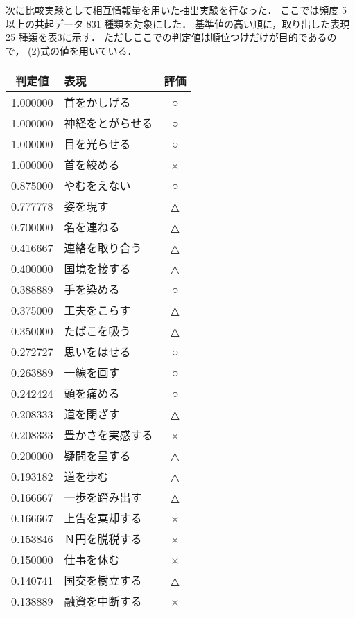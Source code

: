 次に比較実験として相互情報量を用いた抽出実験を行なった．
ここでは頻度 5 以上の共起データ 831 種類を対象にした．
基準値の高い順に，取り出した表現 25 種類を表3に示す．
ただしここでの判定値は順位つけだけが目的であるので，
(2)式の値を用いている．



\noindent
\begin{minipage}{70mm} 
\vspace{5mm}
\small
  \begin{center}
    \begin{tabular}{|c|l|c|} \hline
判定値 &  表現   & 評価\\  \hline \hline
1.000000   &  首をかしげる & ○ \\ \hline
1.000000   &  神経をとがらせる  & ○ \\ \hline
1.000000   &  目を光らせる  & ○ \\ \hline
1.000000   &  首を絞める  & × \\ \hline
0.875000   &  やむをえない  & ○ \\ \hline
0.777778   &  姿を現す  & △ \\ \hline
0.700000   &  名を連ねる  & △ \\ \hline
0.416667   &  連絡を取り合う  & △ \\ \hline
0.400000   &  国境を接する  & △ \\ \hline
0.388889   &  手を染める  & ○ \\ \hline
0.375000   &  工夫をこらす  & △ \\ \hline
0.350000   &  たばこを吸う  & △ \\ \hline
0.272727   &  思いをはせる  & ○ \\ \hline
0.263889   &  一線を画す  & ○ \\ \hline
0.242424   &  頭を痛める  & ○ \\ \hline
0.208333   &  道を閉ざす  & △ \\ \hline
0.208333   &  豊かさを実感する  & × \\ \hline
0.200000   &  疑問を呈する  & △ \\ \hline
0.193182   &  道を歩む  & △ \\ \hline
0.166667   &  一歩を踏み出す  & △ \\ \hline
0.166667   &  上告を棄却する  & × \\ \hline
0.153846   &  Ｎ円を脱税する  & × \\ \hline
0.150000   &  仕事を休む  & × \\ \hline
0.140741   &  国交を樹立する  & △ \\ \hline
0.138889   &  融資を中断する  & × \\ \hline
    \end{tabular} 


\end{center}
\end{minipage}
